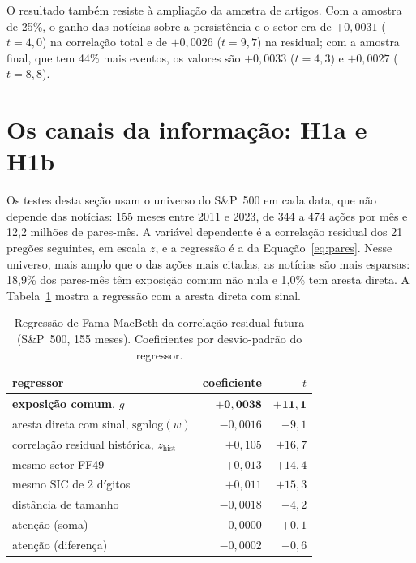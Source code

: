 O resultado também resiste à ampliação da amostra de artigos. Com a amostra de 25\%, o ganho das notícias
sobre a persistência e o setor era de $+0{,}0031$ ($t=4{,}0$) na correlação total e de $+0{,}0026$
($t=9{,}7$) na residual; com a amostra final, que tem 44\% mais eventos, os valores são $+0{,}0033$
($t=4{,}3$) e $+0{,}0027$ ($t=8{,}8$).

\section{Os canais da informação: H1a e H1b}
\label{sec:canais}

Os testes desta seção usam o universo do S\&P~500 em cada data, que não depende das notícias: 155 meses
entre 2011 e 2023, de 344 a 474 ações por mês e 12,2 milhões de pares-mês. A variável dependente é a
correlação residual dos 21 pregões seguintes, em escala $z$, e a regressão é a da
Equação~\eqref{eq:pares}. Nesse universo, mais amplo que o das ações mais citadas, as notícias são mais
esparsas: 18,9\% dos pares-mês têm exposição comum não nula e 1,0\% tem aresta direta. A
Tabela~\ref{tab:fm-residual} mostra a regressão com a aresta direta com sinal.

\begin{table}[htbp]
\centering
\small
\caption{Regressão de Fama-MacBeth da correlação residual futura (S\&P~500, 155 meses). Coeficientes
por desvio-padrão do regressor.}
\label{tab:fm-residual}
\begin{tabular}{lrr}
\toprule
regressor & coeficiente & $t$ \\
\midrule
\textbf{exposição comum}, $g$ & $\mathbf{+0{,}0038}$ & $\mathbf{+11{,}1}$ \\
aresta direta com sinal, $\mathrm{sgnlog}(w)$ & $-0{,}0016$ & $-9{,}1$ \\
correlação residual histórica, $z_{\mathrm{hist}}$ & $+0{,}105$ & $+16{,}7$ \\
mesmo setor FF49 & $+0{,}013$ & $+14{,}4$ \\
mesmo SIC de 2 dígitos & $+0{,}011$ & $+15{,}3$ \\
distância de tamanho & $-0{,}0018$ & $-4{,}2$ \\
atenção (soma) & $0{,}0000$ & $+0{,}1$ \\
atenção (diferença) & $-0{,}0002$ & $-0{,}6$ \\
\bottomrule
\end{tabular}
\end{table}

